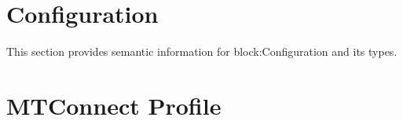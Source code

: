 \section{Configuration}
\label{sec:Configuration}
This section provides semantic information for {block:Configuration} and its types.







\section{MTConnect Profile}
\label{sec:MTConnect Profile}



